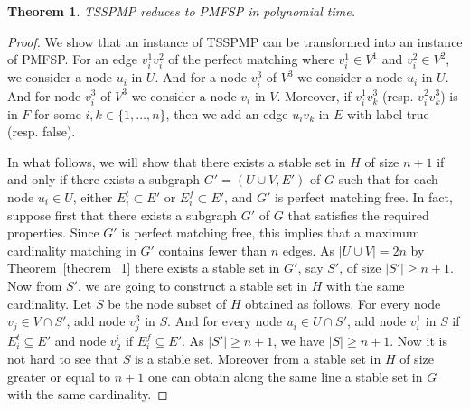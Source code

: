 \documentclass{article}
\theoremstyle{plain}
\newtheorem{theorem}{Theorem}
\theoremstyle{definition}
\begin{document}
\begin{theorem}
\label{theorem_2}
TSSPMP reduces to PMFSP in polynomial time.
\end{theorem}
\begin{proof}
We show that an instance of TSSPMP can be transformed into an instance of PMFSP. For an edge $v^1_iv^2_i$ of the perfect matching where $v^1_i\in V^1$ and $v^2_i\in V^2$, we consider a node $u_i$ in $U$. And for a node $v^3_i$ of $V^3$ we consider a node $u_i$ in $U$. And for node $v^3_i$ of $V^3$ we consider a node $v_i$ in $V$. Moreover, if $v^1_iv^3_k$ (resp. $v^2_iv^3_k$) is in $F$ for some $i,k\in\{1,\dots,n\}$, then we add an edge $u_iv_k$ in $E$ with label true (resp. false).

In what follows, we will show that there exists a stable set in $H$ of size $n+1$ if and only if there exists a subgraph $G'=(U\cup V,E')$ of $G$ such that for each node $u_i\in U$, either $E^t_i\subset E'$ or $E^f_i\subset E'$, and $G'$ is perfect matching free. In fact, suppose first that there exists a subgraph $G'$ of $G$ that satisfies the required properties. Since $G'$ is perfect matching free, this implies that a maximum cardinality matching in $G'$ contains fewer than $n$ edges. As $|U\cup V|=2n$ by Theorem~\ref{theorem_1} there exists a stable set in $G'$, say $S'$, of size $|S'|\geq n+1$. Now from $S'$, we are going to construct a stable set in $H$ with the same cardinality. Let $S$ be the node subset of $H$ obtained as follows. For every node $v_j\in V\cap S'$, add node $v^3_j$ in $S$. And for every node $u_i\in U\cap S'$, add node $v^1_i$ in $S$ if $E^t_i\subseteq E'$ and node $v^i_2$ if $E^f_i\subseteq E'$. As $|S'|\geq n+1$, we have $|S|\geq n+1$. Now it is not hard to see that $S$ is a stable set. Moreover from a stable set in $H$ of size greater or equal to $n+1$ one can obtain along the same line a stable set in $G$ with the same cardinality.
\end{proof}
\end{document}
